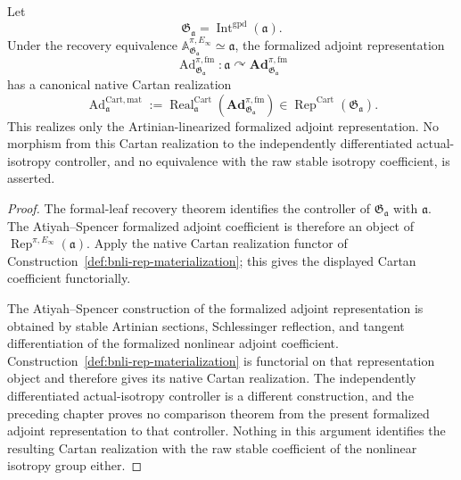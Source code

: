 \begin{theorem}
\label{thm:bnli-adjoint-materialization}
Let
\[
    \mathfrak G_{\mathfrak a}
    =
    \operatorname{Int}^{\mathrm{gpd}}(\mathfrak a).
\]
Under the recovery equivalence
$\mathbb A_{\mathfrak G_{\mathfrak a}}^{\pi,E_\infty}\simeq\mathfrak a$, the
formalized adjoint representation
\[
    \operatorname{Ad}^{\pi,\mathrm{fm}}_{\mathfrak G_{\mathfrak a}}:
    \mathfrak a
    \curvearrowright
    \mathbf{Ad}_{\mathfrak G_{\mathfrak a}}^{\pi,\mathrm{fm}}
\]
has a canonical native Cartan realization
\[
\boxed{
    \operatorname{Ad}^{\mathrm{Cart,mat}}_{\mathfrak a}
    :=
    \operatorname{Real}^{\mathrm{Cart}}_{\mathfrak a}
    \left(
      \mathbf{Ad}_{\mathfrak G_{\mathfrak a}}^{\pi,\mathrm{fm}}
    \right)
    \in
    \operatorname{Rep}^{\mathrm{Cart}}(\mathfrak G_{\mathfrak a}).}
\]
This realizes only the Artinian-linearized formalized adjoint representation.
No morphism from this Cartan realization to the independently differentiated
actual-isotropy controller, and no equivalence with the raw stable isotropy
coefficient, is asserted.
\end{theorem}

\begin{proof}
The formal-leaf recovery theorem identifies the controller of
$\mathfrak G_{\mathfrak a}$ with $\mathfrak a$.  The Atiyah--Spencer
formalized adjoint coefficient is therefore an object of
$\operatorname{Rep}^{\pi,E_\infty}(\mathfrak a)$.  Apply the native Cartan
realization functor of Construction~\ref{def:bnli-rep-materialization}; this
gives the displayed Cartan coefficient functorially.

The Atiyah--Spencer construction of the formalized adjoint representation is
obtained by stable Artinian sections, Schlessinger reflection, and tangent
differentiation of the formalized nonlinear adjoint coefficient.
Construction~\ref{def:bnli-rep-materialization} is functorial on that
representation object and therefore gives its native Cartan realization.
The independently differentiated actual-isotropy controller is a different
construction, and the preceding chapter proves no comparison theorem from the
present formalized adjoint representation to that controller.  Nothing in
this argument identifies the resulting Cartan realization with the raw stable
coefficient of the nonlinear isotropy group either.
\end{proof}


